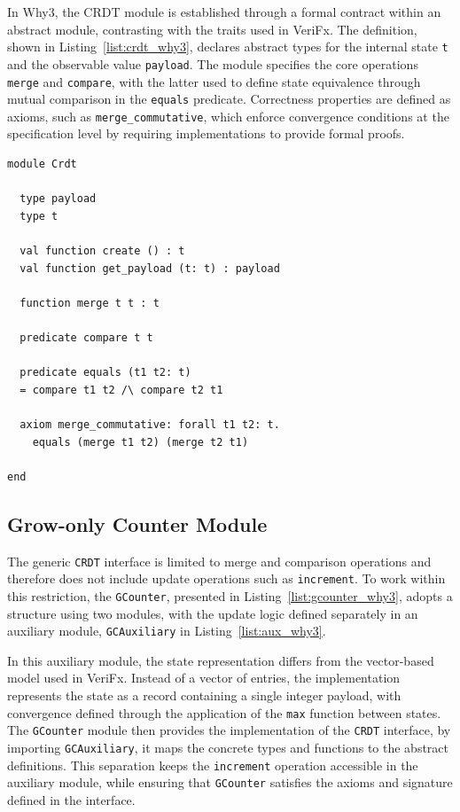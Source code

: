 In Why3, the CRDT module is established through a formal contract within an abstract module, contrasting with the traits used in VeriFx. The definition, shown in Listing~\ref{list:crdt_why3}, declares abstract types for the internal state \texttt{t} and the observable value \texttt{payload}. The module specifies the core operations \texttt{merge} and \texttt{compare}, with the latter used to define state equivalence through mutual comparison in the \texttt{equals} predicate. Correctness properties are defined as axioms, such as \texttt{merge\_commutative}, which enforce convergence conditions at the specification level by requiring implementations to provide formal proofs.

\begin{lstlisting}[caption={The implementation of CRDT module in Why3}, label={list:crdt_why3}]
module Crdt

  type payload
  type t

  val function create () : t
  val function get_payload (t: t) : payload

  function merge t t : t

  predicate compare t t

  predicate equals (t1 t2: t)
  = compare t1 t2 /\ compare t2 t1

  axiom merge_commutative: forall t1 t2: t.
    equals (merge t1 t2) (merge t2 t1)

end
\end{lstlisting}

\subsection{Grow-only Counter Module}
\label{sub:gcounter_whyml}

The generic \texttt{CRDT} interface is limited to merge and comparison operations and therefore does not include update operations such as \texttt{increment}. To work within this restriction, the \texttt{GCounter}, presented in Listing~\ref{list:gcounter_why3}, adopts a structure using two modules, with the update logic defined separately in an auxiliary module, \texttt{GCAuxiliary} in Listing~\ref{list:aux_why3}.

In this auxiliary module, the state representation differs from the vector-based model used in VeriFx. Instead of a vector of entries, the implementation represents the state as a record containing a single integer payload, with convergence defined through the application of the \texttt{max} function between states. The \texttt{GCounter} module then provides the implementation of the \texttt{CRDT} interface, by importing \texttt{GCAuxiliary}, it maps the concrete types and functions to the abstract definitions. This separation keeps the \texttt{increment} operation accessible in the auxiliary module, while ensuring that \texttt{GCounter} satisfies the axioms and signature defined in the interface.


